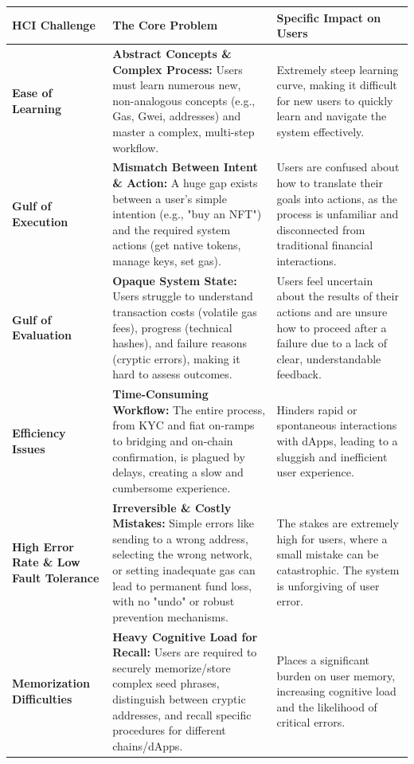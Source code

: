 \documentclass[preprint,12pt]{elsarticle}
\begin{document}
\begin{table}[htbp]
\centering
\footnotesize
\renewcommand{\arraystretch}{0.9}
\begin{tabularx}{\textwidth}{|p{2.5cm}|X|X|}
\hline
\textbf{HCI Challenge} & \textbf{The Core Problem} & \textbf{Specific Impact on Users} \\
\hline
\textbf{Ease of Learning} & \textbf{Abstract Concepts \& Complex Process:} Users must learn numerous new, non-analogous concepts (e.g., Gas, Gwei, addresses) and master a complex, multi-step workflow. & Extremely steep learning curve, making it difficult for new users to quickly learn and navigate the system effectively. \\
\hline
\textbf{Gulf of Execution} & \textbf{Mismatch Between Intent \& Action:} A huge gap exists between a user's simple intention (e.g., "buy an NFT") and the required system actions (get native tokens, manage keys, set gas). & Users are confused about how to translate their goals into actions, as the process is unfamiliar and disconnected from traditional financial interactions. \\
\hline
\textbf{Gulf of Evaluation} & \textbf{Opaque System State:} Users struggle to understand transaction costs (volatile gas fees), progress (technical hashes), and failure reasons (cryptic errors), making it hard to assess outcomes. & Users feel uncertain about the results of their actions and are unsure how to proceed after a failure due to a lack of clear, understandable feedback. \\
\hline
\textbf{Efficiency Issues} & \textbf{Time-Consuming Workflow:} The entire process, from KYC and fiat on-ramps to bridging and on-chain confirmation, is plagued by delays, creating a slow and cumbersome experience. & Hinders rapid or spontaneous interactions with dApps, leading to a sluggish and inefficient user experience. \\
\hline
\textbf{High Error Rate \& Low Fault Tolerance} & \textbf{Irreversible \& Costly Mistakes:} Simple errors like sending to a wrong address, selecting the wrong network, or setting inadequate gas can lead to permanent fund loss, with no "undo" or robust prevention mechanisms. & The stakes are extremely high for users, where a small mistake can be catastrophic. The system is unforgiving of user error. \\
\hline
\textbf{Memorization Difficulties} & \textbf{Heavy Cognitive Load for Recall:} Users are required to securely memorize/store complex seed phrases, distinguish between cryptic addresses, and recall specific procedures for different chains/dApps. & Places a significant burden on user memory, increasing cognitive load and the likelihood of critical errors. \\

\end{tabularx}
\end{table}
\end{document}
